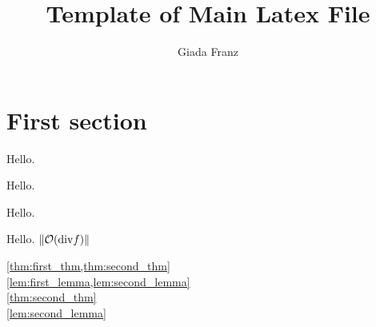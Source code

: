 \documentclass[a4paper,12pt]{article}
\title{Template of Main Latex File}
\author{Giada Franz}
\begin{document}
 
\maketitle
\tableofcontents

\section{First section}
\begin{theorem}\label{thm:first_thm}
    Hello.
\end{theorem}
\begin{theorem}\label{thm:second_thm}
    Hello.
\end{theorem}
\begin{lemma}\label{lem:first_lemma}
    Hello.
\end{lemma}
\begin{lemma}\label{lem:second_lemma}
    Hello. $\lVert\mathcal{O}(\mathrm{div} f)\rVert$
\end{lemma}
\cref{thm:first_thm,thm:second_thm}\\
\cref{lem:first_lemma,lem:second_lemma}\\
\cref{thm:second_thm}\\
\cref{lem:second_lemma}

% 
% 
\end{document}
